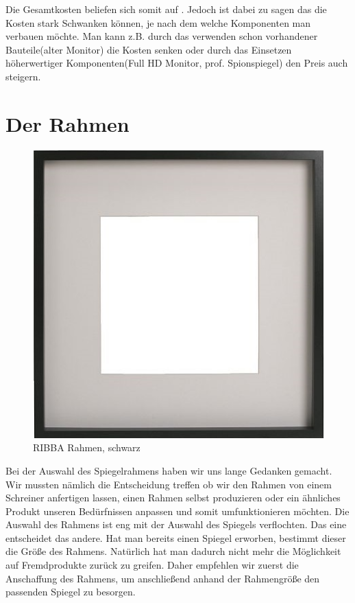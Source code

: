 Die Gesamtkosten beliefen sich somit auf . Jedoch ist dabei zu sagen das die Kosten stark Schwanken können, je nach dem welche Komponenten man verbauen möchte. Man kann z.B. durch das verwenden schon vorhandener Bauteile(alter Monitor) die Kosten senken oder durch das Einsetzen höherwertiger Komponenten(Full HD Monitor, prof. Spionspiegel) den Preis auch steigern.

\section{Der Rahmen}
\begin{figure}
	\vspace{-20pt}
	\begin{center}
		\includegraphics[scale=0.5]{bilder/ribba-rahmen-schwarz.jpg}
	\end{center}
	\caption{RIBBA Rahmen, schwarz}
	\vspace{-10pt}
\end{figure}
Bei der Auswahl des Spiegelrahmens haben wir uns lange Gedanken gemacht. Wir mussten nämlich die Entscheidung treffen ob wir den Rahmen von einem Schreiner anfertigen lassen, einen Rahmen selbst produzieren oder ein ähnliches Produkt unseren Bedürfnissen anpassen und somit umfunktionieren möchten. Die Auswahl des Rahmens ist eng mit der Auswahl des Spiegels verflochten. Das eine entscheidet das andere. Hat man bereits einen Spiegel erworben, bestimmt dieser die Größe des Rahmens. Natürlich hat man dadurch nicht mehr die Möglichkeit auf Fremdprodukte zurück zu greifen. Daher empfehlen wir zuerst die Anschaffung des Rahmens, um anschließend anhand der Rahmengröße den passenden Spiegel zu besorgen. \\
